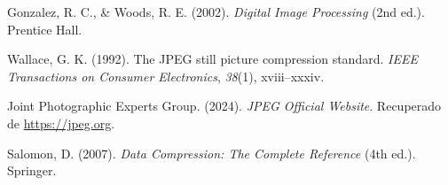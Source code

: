 \documentclass[8pt,a4paper]{article}
\theoremstyle{definition}
\theoremstyle{remark}
\begin{document}
\begin{multicols}{2}
\begin{flushleft}
\end{flushleft}
        
    \begin{thebibliography}{00}
	
	        \newblock Gonzalez, R. C., \& Woods, R. E. (2002). \textit{Digital Image Processing} (2nd ed.). Prentice Hall.
	
	    Wallace, G. K. (1992). The JPEG still picture compression          standard. \textit{IEEE Transactions on Consumer Electronics}, \textit{38}(1),          xviii--xxxiv.
	
	        \newblock Joint Photographic Experts Group. (2024). \textit{JPEG Official Website}. Recuperado de \newblock \textcolor{blue}
            {\url{https://jpeg.org}.}

            Salomon, D. (2007). \textit{Data Compression: The Complete Reference} (4th ed.). Springer.
	
        \end{thebibliography}
           
\end{multicols}
    
\end{document}
